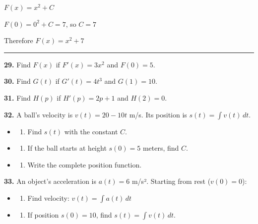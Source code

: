 \documentclass[
  11pt,
]{article}
\providecommand{\tightlist}{%
  \setlength{\itemsep}{0pt}\setlength{\parskip}{0pt}}
\begin{document}
\(F(x) = x^2 + C\)

\(F(0) = 0^2 + C = 7\), so \(C = 7\)

Therefore \(F(x) = x^2 + 7\)

\begin{center}\rule{0.5\linewidth}{0.5pt}\end{center}

\textbf{29.} Find \(F(x)\) if \(F'(x) = 3x^2\) and \(F(0) = 5\).

\textbf{30.} Find \(G(t)\) if \(G'(t) = 4t^3\) and \(G(1) = 10\).

\textbf{31.} Find \(H(p)\) if \(H'(p) = 2p + 1\) and \(H(2) = 0\).

\textbf{32.} A ball's velocity is \(v(t) = 20 - 10t\) m/s. Its position
is \(s(t) = \int v(t) \, dt\).

\begin{itemize}
\item
  \begin{enumerate}
  \def\labelenumi{(\alph{enumi})}
  \tightlist
  \item
    Find \(s(t)\) with the constant \(C\).
  \end{enumerate}
\item
  \begin{enumerate}
  \def\labelenumi{(\alph{enumi})}
  \setcounter{enumi}{1}
  \tightlist
  \item
    If the ball starts at height \(s(0) = 5\) meters, find \(C\).
  \end{enumerate}
\item
  \begin{enumerate}
  \def\labelenumi{(\alph{enumi})}
  \setcounter{enumi}{2}
  \tightlist
  \item
    Write the complete position function.
  \end{enumerate}
\end{itemize}

\textbf{33.} An object's acceleration is \(a(t) = 6\) m/s². Starting
from rest (\(v(0) = 0\)):

\begin{itemize}
\item
  \begin{enumerate}
  \def\labelenumi{(\alph{enumi})}
  \tightlist
  \item
    Find velocity: \(v(t) = \int a(t) \, dt\)
  \end{enumerate}
\item
  \begin{enumerate}
  \def\labelenumi{(\alph{enumi})}
  \setcounter{enumi}{1}
  \tightlist
  \item
    If position \(s(0) = 10\), find \(s(t) = \int v(t) \, dt\).
  \end{enumerate}
\end{itemize}
\end{document}
